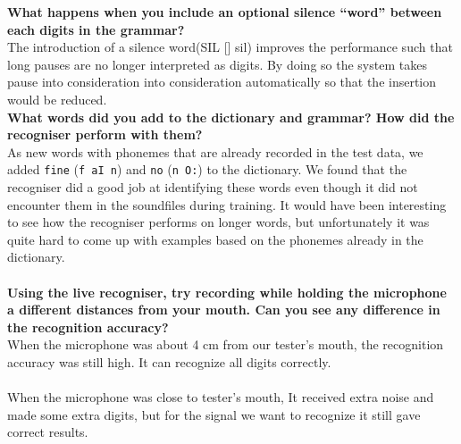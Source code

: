 \documentclass[onecolumn]{article}
\begin{document}
\noindent \textbf{What happens when you include an optional silence ``word'' between each digits in the grammar?}\\
The introduction of a silence word(SIL [] sil) improves the performance such that long pauses are no longer interpreted as digits. By doing so the system takes pause into consideration into consideration automatically so that the insertion would be reduced.\\

\noindent \textbf{What words did you add to the dictionary and grammar? How did the recogniser perform with them?}\\
As new words with phonemes that are already recorded in the test data, we added \texttt{fine} (\texttt{f~aI~n}) and \texttt{no} (\texttt{n~O:}) to the dictionary. We found that the recogniser did a good job at identifying these words even though it did not encounter them in the soundfiles during training. It would have been interesting to see how the recogniser performs on longer words, but unfortunately it was quite hard to come up with examples based on the phonemes already in the dictionary.\\
\\

\noindent \textbf{Using the live recogniser, try recording while holding the microphone a different distances from your mouth. Can you see any difference in the recognition accuracy?}\\
When the microphone was about 4 cm from our tester's mouth, the recognition accuracy was still high. It can recognize all digits correctly.\\
\\
When the microphone was close to tester's mouth, It received extra noise and made some extra digits, but for the signal we want to recognize it still gave correct results.
\end{document}

